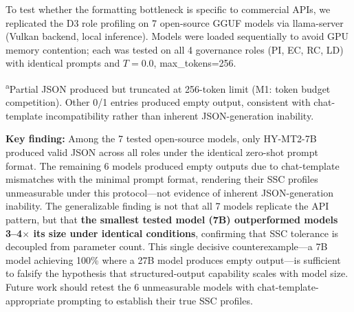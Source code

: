 \documentclass[11pt,a4paper]{article}
\begin{document}
To test whether the formatting bottleneck is specific to commercial APIs, we replicated the D3 role profiling on 7 open-source GGUF models via llama-server (Vulkan backend, local inference). Models were loaded sequentially to avoid GPU memory contention; each was tested on all 4 governance roles (PI, EC, RC, LD) with identical prompts and $T=0.0$, max\_tokens=256.

\begin{table}[htbp]\centering\caption{Open-Source GGUF Model D3 Role Profiling}\label{tab:gguf}\small
{}

\vspace{4pt}
{\footnotesize\textsuperscript{a}Partial JSON produced but truncated at 256-token limit (M1: token budget competition). Other 0/1 entries produced empty output, consistent with chat-template incompatibility rather than inherent JSON-generation inability.}
\end{table}

\textbf{Key finding:} Among the 7 tested open-source models, only HY-MT2-7B produced valid JSON across all roles under the identical zero-shot prompt format. The remaining 6 models produced empty outputs due to chat-template mismatches with the minimal prompt format, rendering their SSC profiles unmeasurable under this protocol---not evidence of inherent JSON-generation inability. The generalizable finding is not that all 7 models replicate the API pattern, but that \textbf{the smallest tested model (7B) outperformed models 3--4$\times$ its size under identical conditions}, confirming that SSC tolerance is decoupled from parameter count. This single decisive counterexample---a 7B model achieving 100\% where a 27B model produces empty output---is sufficient to falsify the hypothesis that structured-output capability scales with model size. Future work should retest the 6 unmeasurable models with chat-template-appropriate prompting to establish their true SSC profiles.
\end{document}
